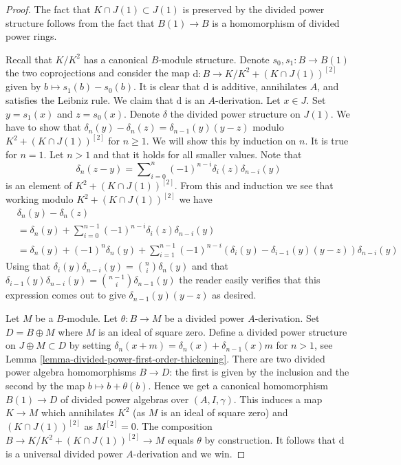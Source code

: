 \begin{proof}
The fact that $K \cap J(1) \subset J(1)$ is preserved by the divided power
structure follows from the fact that $B(1) \to B$ is a homomorphism of
divided power rings.

\medskip\noindent
Recall that $K/K^2$ has a canonical $B$-module structure.
Denote $s_0, s_1 : B \to B(1)$ the two coprojections and consider
the map $\text{d} : B \to K/K^2 +(K \cap J(1))^{[2]}$ given by
$b \mapsto s_1(b) - s_0(b)$. It is clear that $\text{d}$ is additive,
annihilates $A$, and satisfies the Leibniz rule.
We claim that $\text{d}$ is an $A$-derivation.
Let $x \in J$. Set $y = s_1(x)$ and $z = s_0(x)$.
Denote $\delta$ the divided power structure on $J(1)$.
We have to show that $\delta_n(y) - \delta_n(z) = \delta_{n - 1}(y)(y - z)$
modulo $K^2 +(K \cap J(1))^{[2]}$ for $n \geq 1$. We will show this
by induction on $n$. It is true for $n = 1$.
Let $n > 1$ and that it holds for all smaller values.
Note that
$$
\delta_n(z - y) =
\sum\nolimits_{i = 0}^n (-1)^{n - i}\delta_i(z)\delta_{n - i}(y)
$$
is an element of $K^2 +(K \cap J(1))^{[2]}$. From this and induction
we see that working modulo $K^2 +(K \cap J(1))^{[2]}$ we have
\begin{align*}
& \delta_n(y) - \delta_n(z) \\
& =
\delta_n(y) +
\sum\nolimits_{i = 0}^{n - 1} (-1)^{n - i}\delta_i(z)\delta_{n - i}(y) \\
& =
\delta_n(y) + (-1)^n\delta_n(y) +
\sum\nolimits_{i = 1}^{n - 1}
(-1)^{n - i}(\delta_i(y) - \delta_{i - 1}(y)(y - z))\delta_{n - i}(y)
\end{align*}
Using that $\delta_i(y)\delta_{n - i}(y) = \binom{n}{i} \delta_n(y)$
and that $\delta_{i - 1}(y)\delta_{n - i}(y) =
\binom{n - 1}{i} \delta_{n - 1}(y)$
the reader easily verifies that this expression comes out to give
$\delta_{n - 1}(y)(y - z)$ as desired.

\medskip\noindent
Let $M$ be a $B$-module. Let $\theta : B \to M$ be a divided power
$A$-derivation.
Set $D = B \oplus M$ where $M$ is an ideal of square zero. Define a
divided power structure on $J \oplus M \subset D$ by setting
$\delta_n(x + m) = \delta_n(x) + \delta_{n - 1}(x)m$ for $n > 1$, see
Lemma \ref{lemma-divided-power-first-order-thickening}.
There are two divided power algebra homomorphisms $B \to D$: the first
is given by the inclusion and the second by the map $b \mapsto b + \theta(b)$.
Hence we get a canonical homomorphism $B(1) \to D$ of divided power
algebras over $(A, I, \gamma)$. This induces a map $K \to M$
which annihilates $K^2$ (as $M$ is an ideal of square zero) and
$(K \cap J(1))^{[2]}$ as $M^{[2]} = 0$. The composition
$B \to K/K^2 + (K \cap J(1))^{[2]} \to M$ equals $\theta$ by construction.
It follows that $\text{d}$
is a universal divided power $A$-derivation and we win.
\end{proof}

